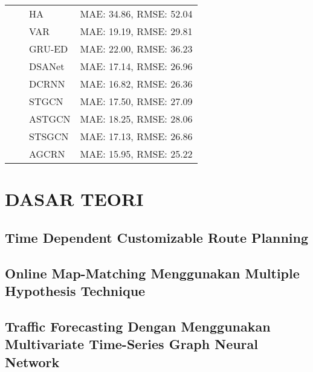 \documentclass[ugmskripsi]{ugmskripsi}
\begin{document}
\begin{longtable}{|p{3.8cm}|p{3.8cm}|l|l|}
& 
& HA & MAE: 34.86, RMSE: 52.04 \\
 &  & VAR & MAE: 19.19, RMSE: 29.81 \\
 &  & GRU-ED &  MAE: 22.00, RMSE: 36.23 \\
 &  & DSANet &  MAE: 17.14, RMSE: 26.96 \\ 
 &  & DCRNN & MAE: 16.82, RMSE: 26.36  \\ 
  &  & STGCN & MAE: 17.50, RMSE: 27.09  \\ 
 &  & ASTGCN & MAE: 18.25, RMSE: 28.06 \\
&  & STSGCN & MAE: 17.13, RMSE: 26.86 \\
&  & AGCRN & MAE: 15.95, RMSE: 25.22 \\
\hline

\end{longtable}






\chapter{DASAR TEORI}
\label{DASAR TEORI}

	\section{Time Dependent Customizable Route Planning}
	\label{time dependent customizable route planning}
	

	\section{Online Map-Matching Menggunakan Multiple Hypothesis Technique}
	\label{multiple hypothesis technique}
		

    \section{Traffic Forecasting Dengan Menggunakan Multivariate Time-Series Graph Neural Network}
    \label{mtgnn-section}
    
    
\end{document}
